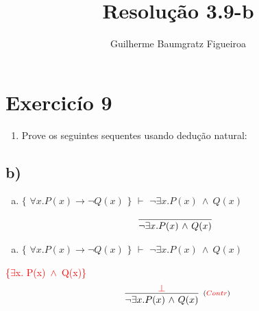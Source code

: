\documentclass[aspectratio=43]{beamer}
\title[\sc{Resolu\c c\~ao}]{Resolu\c c\~ao 3.9-b}
\author[Guilherme Baumgratz Figueiroa]{Guilherme Baumgratz Figueiroa}
\institute[UFOP]{Universidade Federal de Ouro Preto} %
\date{}
\newcommand{\ex}{$\exists$}
\newcommand{\nao}{$\neg$}
\newcommand{\nex}{\nao\ex}
\newcommand{\andd}{$\wedge$}
\begin{document}
	
	\begin{frame}
		\titlepage
	\end{frame}
	
	\section{Exercic\'io 9}
	
	\begin{frame}%
    
    	\begin{enumerate}[1.]
			\item Prove os seguintes sequentes usando dedu\c c\~ao natural: \\
		\end{enumerate}
				
	\end{frame}
    \subsection{b)}
    
	\begin{frame}[fragile]
    	
    	\begin{enumerate}[b)]
			
			\item $\{$ $\forall x.P(x)\to \neg Q(x)$ $\}$ $\vdash$ $ \neg\exists  x.P(x)\ \wedge\ Q(x)$ \\ 
			
		\end{enumerate}
        \vspace{100pt}
        \[
        \begin{array}{c}
		
        	\infer[_{}]
            {$\nex$  x. P(x)\ $\andd$\ Q(x)}
            {}
        
		\end{array}
        \]
        
	\end{frame}
    
    \begin{frame}[fragile]
    	
    	\begin{enumerate}[b)]
			
			\item $\{$ $\forall x.P(x)\to \neg Q(x)$ $\}$ $\vdash$ $ \neg\exists  x.P(x)\ \wedge\ Q(x)$ \\ 
			
		\end{enumerate}
        \textcolor{red}{\{\ex  x. P(x)\ \andd\ Q(x)\}}
        \vspace{95pt}
        \[
        \begin{array}{c}
		
        	\infer[_{(\textcolor{red}{Contr})}]
            {$\nex$  x. P(x)\ $\andd$\ Q(x)}
            {\textcolor{red}{\bot}}
        
		\end{array}
        \]
        
	\end{frame}
    
\end{document}
